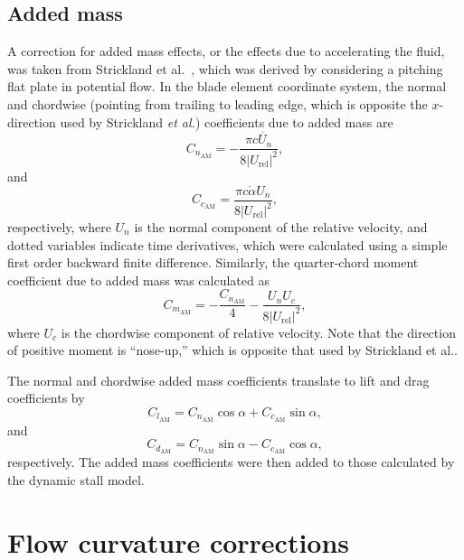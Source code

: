 \subsection{Added mass}

A correction for added mass effects, or the effects due to accelerating the
fluid, was taken from Strickland et al.~\cite{Strickland1981}, which was
derived by considering a pitching flat plate in potential flow. In the blade
element coordinate system, the normal and chordwise (pointing from trailing to
leading edge, which is opposite the $x$-direction used by Strickland \emph{et
    al.}) coefficients due to added mass are
\begin{equation}
    C_{n_\mathrm{AM}} = -\frac{\pi c \dot{U_n}}{8 | U_\mathrm{rel} |^2},
\end{equation}
and
\begin{equation}
    C_{c_\mathrm{AM}} = \frac{\pi c \dot{\alpha} U_n }{8 | U_\mathrm{rel} |^2},
\end{equation}
respectively, where $U_n$ is the normal component of the relative velocity, and
dotted variables indicate time derivatives, which were calculated using a simple
first order backward finite difference. Similarly, the quarter-chord moment
coefficient due to added mass was calculated as
\begin{equation}
    C_{m_\mathrm{AM}} = -\frac{C_{n_\mathrm{AM}}}{4}
        - \frac{U_n U_c}{8 | U_\mathrm{rel} |^2},
\end{equation}
where $U_c$ is the chordwise component of relative velocity. Note that the
direction of positive moment is ``nose-up,'' which is opposite that used by
Strickland et al..

The normal and chordwise added mass coefficients translate to lift and drag
coefficients by
\begin{equation}
    C_{l_\mathrm{AM}} = C_{n_\mathrm{AM}} \cos \alpha + C_{c_\mathrm{AM}} \sin
    \alpha,
\end{equation}
and
\begin{equation}
    C_{d_\mathrm{AM}} = C_{n_\mathrm{AM}} \sin \alpha - C_{c_\mathrm{AM}} \cos
    \alpha,
\end{equation}
respectively. The added mass coefficients were then added to those calculated by
the dynamic stall model.


\section{Flow curvature corrections}


